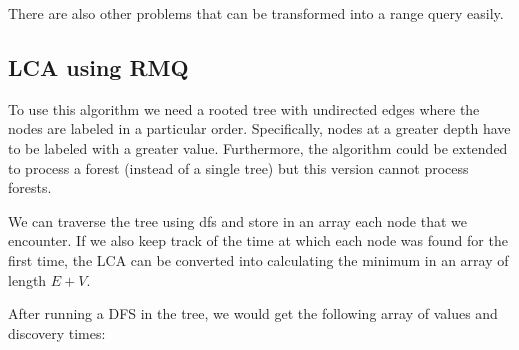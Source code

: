 \documentclass[12pt]{report}
\begin{document}
\newpage
There are also other problems that can be transformed into a range query easily.

\subsection{LCA using RMQ}
To use this algorithm we need a rooted tree with undirected edges where the 
nodes are labeled in a particular order. Specifically, nodes at a greater
depth have to be labeled with a greater value. Furthermore, the algorithm
could be extended to process a forest (instead of a single tree) but 
this version cannot process forests.

We can traverse the tree using dfs and store in an array each node that we 
encounter. If we also keep track of the time at which each node was found
for the first time, the LCA can be converted into calculating the minimum
in an array of length $E+V$.

\begin{figure}[h!]
		\centering
\end{figure}
After running a DFS in the tree, we would get the following array of 
values and discovery times:
\begin{figure}[h!]
		\centering
		\begin{subfigure}{0.55\textwidth}
		\centering
{}
		\end{subfigure}
		\begin{subfigure}{0.4\textwidth}
		\centering
		\end{subfigure}

\end{figure}
\end{document}
